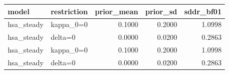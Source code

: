 \begin{tabular}{llrrr}
\toprule
model & restriction & prior\_mean & prior\_sd & sddr\_bf01 \\
\midrule
hsa\_steady & kappa\_0=0 & 0.1000 & 0.2000 & 1.0998 \\
hsa\_steady & delta=0 & 0.0000 & 0.0200 & 0.2863 \\
hsa\_steady & kappa\_0=0 & 0.1000 & 0.2000 & 1.0998 \\
hsa\_steady & delta=0 & 0.0000 & 0.0200 & 0.2863 \\
\bottomrule
\end{tabular}
